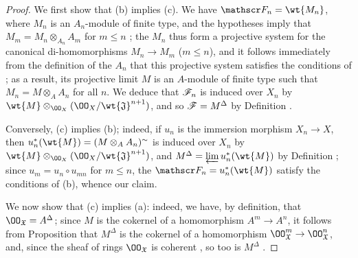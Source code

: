 \begin{proof}
\label{proof-1.10.10.5}
We first show that (b) implies (c).
We have $\sh{F}_n=\wt{M_n}$, where $M_n$ is an $A_n$-module of finite type, and the hypotheses imply that $M_m=M_n\otimes_{A_n}A_m$ for $m\leq n$ ; the $M_n$ thus form a projective system for the canonical di-homomorphisms $M_n\to M_m$ ($m\leq n$), and it follows immediately from the definition of the $A_n$ that this projective system satisfies the conditions of ; as a result, its projective limit $M$ is an $A$-module of finite type such that $M_n=M\otimes_A A_n$ for all $n$.
We deduce that $\mathscr{F}_n$ is induced over $X_n$ by $\wt{M}\otimes_{\OO_X}(\OO_X/\wt{\mathfrak{J}}^{n+1})$, and so $\mathscr{F}=M^\Delta$ by Definition .

Conversely, (c) implies (b); indeed, if $u_n$ is the immersion morphism $X_n\to X$, then $u_n^*(\wt{M})=(M\otimes_A A_n)^\sim$ is induced over $X_n$ by $\wt{M}\otimes_{\OO_X}(\OO_X/\wt{\mathfrak{J}}^{n+1})$, and $M^\Delta=\varprojlim u_n^*(\wt{M})$ by Definition ; since $u_m=u_n\circ u_{mn}$ for $m\leq n$, the $\sh{F}_n=u_n^*(\wt{M})$ satisfy the conditions of (b), whence our claim.

We now show that (c) implies (a): indeed, we have, by definition, that $\OO_\mathfrak{X}=A^\Delta$; since $M$ is the cokernel of a homomorphism $A^m\to A^n$, it follows from Proposition  that $M^\Delta$ is the cokernel of a homomorphism $\OO_\mathfrak{X}^m\to\OO_\mathfrak{X}^n$, and, since the sheaf of rings $\OO_\mathfrak{X}$ is coherent , so too is $M^\Delta$ .


\end{proof}
